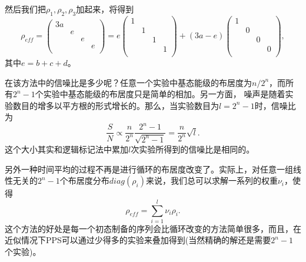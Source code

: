 然后我们把$\rho_1,\rho_2,\rho_3$加起来，将得到
\begin{equation}\label{aaa}
\rho_{eff} = \left(
                      \begin{array}{cccc}
                        3a &   &   &   \\
                          & e &   &   \\
                          &   & e &   \\
                          &   &   & e \\
                      \end{array}
                    \right) = e\left(
                      \begin{array}{cccc}
                        1 &   &   &   \\
                          & 1 &   &   \\
                          &   & 1 &   \\
                          &   &   & 1 \\
                      \end{array}
                    \right)+(3a-e)\left(
                      \begin{array}{cccc}
                        1 &   &   &   \\
                          & 0 &   &   \\
                          &   & 0 &   \\
                          &   &   & 0 \\
                      \end{array}
                    \right),
\end{equation}
其中$e = b+c+d$。

在该方法中的信噪比是多少呢？任意一个实验中基态能级的布居度为$n/2^n$，而所有$2^n-1$个实验中基态能级的布居度只是简单的相加。另一方面，
噪声是随着实验数目的增多以平方根的形式增长的。那么，当实验数目为$l = 2^n-1$时，信噪比为
\begin{equation}\label{aaa}
\frac{S}{N}\propto \frac{n}{2^n}\frac{2^n-1}{\sqrt{2^n-1}} = \frac{n}{2^n}\sqrt{l} .
\end{equation}
这个大小其实和逻辑标记法中累加$l$次实验所得到的信噪比是相同的。

另外一种时间平均的过程不再是进行循环的布居度改变了。实际上，对任意一组线性无关的$2^n-1$个布居度分布$diag(\rho_i)$来说，我们总可以求解一系列的权重$\nu_i$，使得
\begin{equation}\label{aaa}
\rho_{eff} = \sum_{i=1}^l \nu_i\rho_i.
\end{equation}
这个方法的好处是每一个初态制备的序列会比循环改变的方法简单很多，而且，在近似情况下PPS可以通过少得多的实验来叠加得到(当然精确的解还是需要$2^n-1$个实验)。

